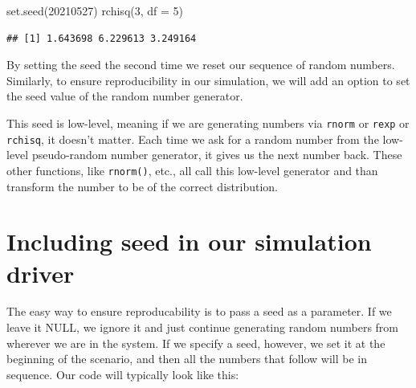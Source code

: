 \documentclass[
]{book}
\newenvironment{Shaded}{\begin{snugshade}}{\end{snugshade}}
\newcommand{\AttributeTok}[1]{\textcolor[rgb]{0.77,0.63,0.00}{#1}}
\newcommand{\DecValTok}[1]{\textcolor[rgb]{0.00,0.00,0.81}{#1}}
\newcommand{\FunctionTok}[1]{\textcolor[rgb]{0.00,0.00,0.00}{#1}}
\newcommand{\NormalTok}[1]{#1}
\begin{document}
\begin{Shaded}
\begin{Highlighting}[]
\FunctionTok{set.seed}\NormalTok{(}\DecValTok{20210527}\NormalTok{)}
\FunctionTok{rchisq}\NormalTok{(}\DecValTok{3}\NormalTok{, }\AttributeTok{df =} \DecValTok{5}\NormalTok{)}
\end{Highlighting}
\end{Shaded}

\begin{verbatim}
## [1] 1.643698 6.229613 3.249164
\end{verbatim}

By setting the seed the second time we reset our sequence of random numbers.
Similarly, to ensure reproducibility in our simulation, we will add an option to set the seed value of the random number generator.

This seed is low-level, meaning if we are generating numbers via \texttt{rnorm} or \texttt{rexp} or \texttt{rchisq}, it doesn't matter.
Each time we ask for a random number from the low-level pseudo-random number generator, it gives us the next number back.
These other functions, like \texttt{rnorm()}, etc., all call this low-level generator and than transform the number to be of the correct distribution.

\hypertarget{including-seed-in-our-simulation-driver}{%
\section{Including seed in our simulation driver}\label{including-seed-in-our-simulation-driver}}

The easy way to ensure reproducability is to pass a seed as a parameter.
If we leave it NULL, we ignore it and just continue generating random numbers from wherever we are in the system.
If we specify a seed, however, we set it at the beginning of the scenario, and then all the numbers that follow will be in sequence.
Our code will typically look like this:
\end{document}
